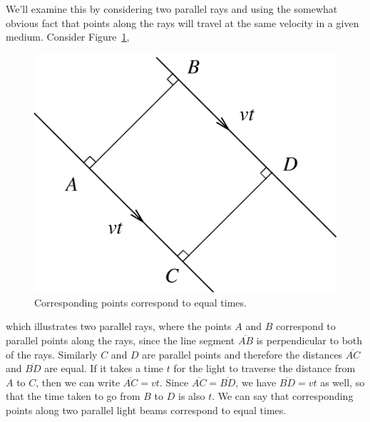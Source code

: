 We'll examine this by considering two parallel rays and using the somewhat 
obvious fact that points along the rays will travel at the same velocity in a 
given medium.  Consider Figure~\ref{fig:opt:parallelpts},
\begin{figure}[htb]
\centering 
\epsfxsize=6cm \includegraphics[scale=0.6]{8_optics/parallelpts.eps}
\caption{Corresponding points correspond to equal times.}
\label{fig:opt:parallelpts}
\end{figure}
which illustrates two parallel rays, where the points $A$ and $B$ correspond
to parallel points along the rays, since the line segment $\overline{AB}$ is 
perpendicular to both of the rays. Similarly $C$ and $D$ are parallel points 
and therefore the distances $\overline{AC}$ and $\overline{BD}$ are equal.
If it takes a time $t$ for the light to traverse the distance from $A$ to $C$, 
then we can write $\overline{AC}=vt$. Since $\overline{AC}=\overline{BD}$, we 
have $\overline{BD}=vt$ as well, so that the time taken to go from $B$ to $D$
is also $t$. We can say that corresponding points along two parallel light 
beams correspond to equal times.

